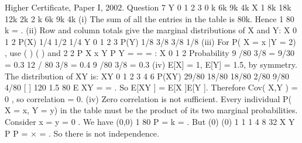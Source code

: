 \documentclass[a4paper,12pt]{article}
\begin{document}
Higher Certificate, Paper I, 2002. Question 7
Y
0 1 2 3
0 k 6k 9k 4k
X 1 8k 18k 12k 2k
2 k 6k 9k 4k
(i) The sum of all the entries in the table is 80k. Hence 1
80
k = .
(ii) Row and column totals give the marginal distributions of X and Y:
X 0 1 2
P(X) 1/4 1/2 1/4
Y 0 1 2 3
P(Y) 1/8 3/8 3/8 1/8
(iii) For P( X = x |Y = 2) , use ( )
( )
and 2
2
P X x Y
P Y
= =
=
:
X 0 1 2
Probability 9 /80
3/8
= 9/30 = 0.3 12 / 80
3/8
= 0.4 9 /80
3/8
= 0.3
(iv) E[X] = 1, E[Y] = 1.5, by symmetry. The distribution of XY is:
XY 0 1 2 3 4 6
P(XY) 29/80 18/80 18/80 2/80 9/80 4/80
[ ] 120 1.5
80
E XY = = .
So E[XY ] = E[X ]E[Y ]. Therefore Cov( X,Y ) = 0 , so correlation = 0.
(iv) Zero correlation is not sufficient. Every individual P( X = x, Y = y) in the
table must be the product of its two marginal probabilities.
Consider x = y = 0 . We have (0,0) 1
80
P = k = . But (0) (0) 1 1 1
4 8 32 X Y P P = × = . So
there is not independence.
\end{document}
